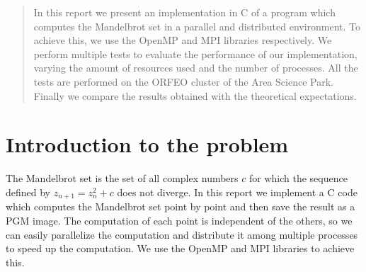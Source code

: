 %
%
\begin{abstract}
    In this report we present an implementation in C of a program which computes
    the Mandelbrot set in a parallel and distributed environment. To achieve
    this, we use the OpenMP and MPI libraries respectively. We perform 
    multiple tests to evaluate the performance of our implementation, varying
    the amount of resources used and the number of processes. All the tests
    are performed on the ORFEO cluster of the Area Science Park. Finally we
    compare the results obtained with the theoretical expectations.
\end{abstract}

\maketitle

\section{Introduction to the problem}
    The Mandelbrot set is the set of all complex numbers $c$ for
    which the sequence defined by $z_{n+1} = z_n^2 + c$ does not diverge.
    In this report we implement a C code which computes the Mandelbrot set
    point by point and then save the result as a PGM image. The computation
    of each point is independent of the others, so we can easily parallelize
    the computation and distribute it among multiple processes to speed up
    the computation. We use the OpenMP and MPI libraries to achieve this.
